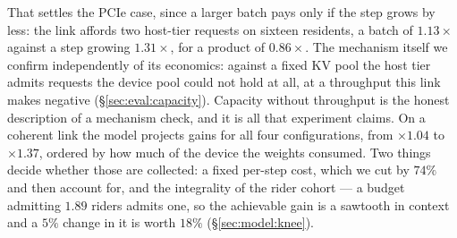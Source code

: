 That settles the PCIe case, since a larger batch pays only if the step grows by
less: the link affords two host-tier requests on sixteen residents, a batch of
$1.13\times$ against a step growing $1.31\times$, for a product of $0.86\times$.
The mechanism itself we confirm independently of its economics: against a fixed KV
pool the host tier admits requests the device pool could not hold at all, at a
throughput this link makes negative (\S\ref{sec:eval:capacity}). Capacity without
throughput is the honest description of a mechanism check, and it is all that
experiment claims.
On a coherent link the model projects gains for all four configurations, from
$\times 1.04$ to $\times 1.37$, ordered by how much of the device the weights
consumed. Two things decide whether those are collected: a fixed per-step cost,
which we cut by $74\%$ and then account for, and the integrality of the rider
cohort --- a budget admitting $1.89$ riders admits one, so the achievable gain is a
sawtooth in context and a $5\%$ change in it is worth $18\%$
(\S\ref{sec:model:knee}).

